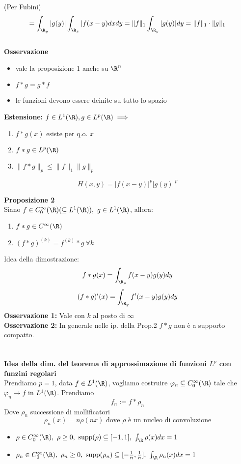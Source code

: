 (Per Fubini)
\[=\int_{\R_y}^{} |g(y)| \int_{\R_x}^{} |f(x-y)dxdy=\|f\|_1 \int_{\R_y}^{} |g(y)|dy=\|f\|_1\cdot \|g\|_1\]   
\divider\\
\textbf{Osservazione}
\begin{itemize}
	\item vale la proposizione 1 anche su $\R^n$ 
	\item $f* g=g * f$ 
	\item le funzioni devono essere deinite su tutto lo spazio
\end{itemize}
\textbf{Estensione:} $f\in L^{1}(\R),g\in L^{p}(\R)\implies$
\begin{enumerate}
	\item $f * g(x)$ esiste per q.o. $x$ 
	\item $f*g\in L^{p}(\R)$ 
	\item $\|f * g\|_p\le \|f\|_1 \|g\|_p$
\end{enumerate}
\[H(x,y)=|f(x-y)|^p|g(y)|^p\]
\begin{tcolorbox}
	\textbf{Proposizione 2} 
	\\Siano $f\in C_0^\infty(\R)(\subseteq  L^{1}(\R)),\ g\in L^{1}(\R)$, allora:
	\begin{enumerate}
		\item $f*g\in C^\infty(\R)$ 
		\item $(f*g)^{(k)}=f^{(k)}*g\ \forall k$
	\end{enumerate}
\end{tcolorbox}
Idea della dimostrazione: 
\[f * g(x)=\int_{\R_y}^{} f(x-y)g(y)dy\]
\[(f *g)'(x)=\int_{\R_y}^{} f'(x-y)g(y)dy\]
\textbf{Osservazione 1:} 
Vale con $k$ al posto di $\infty$\\
\textbf{Osservazione 2:} In generale nelle ip. della Prop.2 $f*g$ non è a supporto compatto. 
\\\divider\\
\\\textbf{Idea della dim. del teorema di approssimazione di funzioni $L ^p$ con funzini regolari}
\\Prendiamo $p=1$, data $f\in L^{1}(\R)$, vogliamo costruire $\varphi_n\subseteq  C_0^\infty(\R)$ tale che $\varphi_n\to f$ in $L^{1}(\R)$. Prendiamo
\[f_n:=f*\rho_n\]
Dove $\rho_n$ successione di mollificatori
\[\rho_n(x)=n\rho(nx) \text{ dove }\rho \text{ è un nucleo di convoluzione}\]
\begin{itemize}
	\item $\rho\in C_0^\infty(\R),\ \rho\ge 0,\ \text{supp}(\rho)\subseteq  [-1,1],\ \int_{\R}^{} \rho(x)dx=1$ 
	\item $\rho_n\in C^\infty_0(\R),\ \rho_n\ge 0,\text{ supp}(\rho_n)\subseteq [-\frac{1}{n},\frac{1}{n}],\ \int_{\R}^{} \rho_n(x)dx=1 $
\end{itemize}
